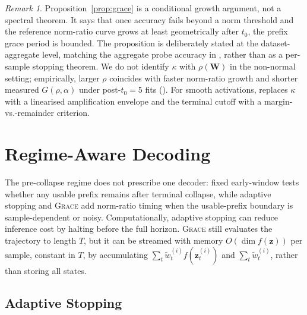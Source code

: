 \documentclass{article}
\theoremstyle{remark}
\newtheorem{remark}[theorem]{Remark}
\newcommand{\bz}{\mathbf{z}}
\newcommand{\bW}{\mathbf{W}}
\newcommand{\grace}{\textnormal{\textsc{Grace}}}
\begin{document}
\begin{remark}
Proposition~\ref{prop:grace} is a conditional growth argument, not a spectral
theorem. It says that once accuracy fails beyond a norm threshold and the
reference norm-ratio curve grows at least geometrically after $t_0$, the prefix
grace period is bounded. The proposition is deliberately stated at the
dataset-aggregate level, matching the aggregate probe accuracy in
, rather than as a per-sample stopping theorem. We do
not identify $\kappa$ with $\rho(\bW)$ in the non-normal
setting; empirically, larger $\rho$ coincides with faster norm-ratio growth and
shorter measured $G(\rho,\alpha)$ under post-$t_0=5$ fits
(). For smooth
activations,  replaces $\kappa$ with a linearised
amplification envelope and the terminal cutoff with a margin-vs.-remainder
criterion.
\end{remark}


\section{Regime-Aware Decoding}
\label{sec:exploit}

The pre-collapse regime does not prescribe one decoder: fixed early-window
tests whether any usable prefix remains after terminal collapse, while adaptive
stopping and \grace{} add norm-ratio timing when the usable-prefix boundary is
sample-dependent or noisy.
Computationally, adaptive stopping can reduce inference cost by halting before
the full horizon. \grace{} still evaluates the trajectory to length $T$, but it
can be streamed with memory $O(\dim f(\bz))$ per sample, constant in $T$, by accumulating
$\sum_t \tilde w_t^{(i)}f(\bz_t^{(i)})$ and $\sum_t \tilde w_t^{(i)}$, rather
than storing all states.

\subsection{Adaptive Stopping}
\end{document}
